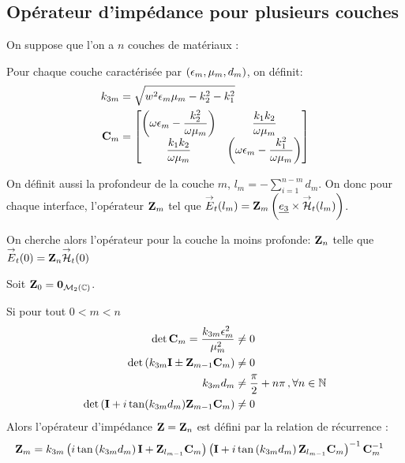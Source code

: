 \subsection{Opérateur d'impédance pour plusieurs couches}
On suppose que l'on a $n$ couches de matériaux : 

\renewcommand{\z}{e_3}
\renewcommand{\x}{e_1}
\renewcommand{\y}{e_2}
\begin{figure}[h!btp]
    \centering
    \begin{tikzpicture}
        
    \end{tikzpicture}
\end{figure}

Pour chaque couche caractérisée par $(\eps_m,\mu_m,d_m)$, on définit:
\begin{align}
k_{3m} &= \sqrt{w^2\eps_m\mu_m - k_2^2 - k_1^2}
\\
\mC_m &=
    \begin{bmatrix}
        \left(\w\eps_m-\frac{k_2^2}{\w\mu_m}\right) & \frac{k_1k_2}{\w\mu_m}\\
        \frac{k_1k_2}{\w\mu_m} & \left(\w\eps_m-\frac{k_1^2}{\w\mu_m}\right)
    \end{bmatrix}
\end{align}

On définit aussi la profondeur de la couche $m$, $l_m = -\sum_{i=1}^{n-m} d_{m} $. On donc pour chaque interface, l'opérateur $\mZ_m$ tel que $\vE_t(l_m) = \mZ_m \left(\v{e_3} \times \vH_t(l_m)\right)$. 

On cherche alors l'opérateur pour la couche la moins profonde: $\mZ_n$ telle que $\vE_t(0) = \mZ_n\vH_t(0)$

\begin{thm}
    Soit $\mZ_0 = \mat{0}_{\mathcal{M}_2(\CC)}$.

    Si pour tout $0<m < n$
        \begin{align}
        \det{\mC_m} = \frac{k_{3m}\eps_m^2}{\mu_m^2} &\not = 0 \\
        \det\left(k_{3m}\mI \pm \mZ_{m-1}\mC_m \right) &\not = 0 \\
        k_{3m}d_m &\not = \frac{\pi}{2}+n\pi\,, \forall n \in \NN \\
        \det\left(\mI + i\tan(k_{3m}d_m)\mZ_{m-1}\mC_m\right) &\not = 0
    \end{align}
    Alors l'opérateur d'impédance $\mZ =  \mZ_n$ est défini par la relation de récurrence : 
    \begin{align}
    \mZ_m &= k_{3m}
    \left(i\tan\left(k_{3m}d_m\right)\mI + \mZ_{l_{m-1}}\mC_m\right)
    \left(\mI + i\tan\left(k_{3m}d_m\right)\mZ_{l_{m-1}}\mC_m\right)^{-1}
    \mC_m^{-1}
    \end{align}
\end{thm}

